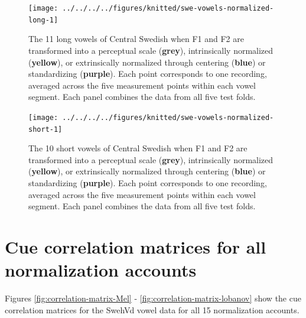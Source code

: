 \documentclass[utf8]{frontiers_suppmat} %
\begin{document}
\begin{landscape}
\begin{figure}

{\centering \texttt{[image: ../../../../figures/knitted/swe-vowels-normalized-long-1]} 

}

\caption{The 11 long vowels of Central Swedish when F1 and F2 are transformed into a perceptual scale (\textbf{grey}), intrinsically normalized (\textbf{yellow}), or extrinsically normalized through centering (\textbf{blue}) or standardizing (\textbf{purple}). Each point corresponds to one recording, averaged across the five measurement points within each vowel segment. Each panel combines the data from all five test folds.}\label{fig:swe-vowels-normalized-long}
\end{figure}

\end{landscape}

\begin{landscape}

\begin{figure}

{\centering \texttt{[image: ../../../../figures/knitted/swe-vowels-normalized-short-1]} 

}

\caption{The 10 short vowels of Central Swedish when F1 and F2 are transformed into a perceptual scale (\textbf{grey}), intrinsically normalized (\textbf{yellow}), or extrinsically normalized through centering (\textbf{blue}) or standardizing (\textbf{purple}). Each point corresponds to one recording, averaged across the five measurement points within each vowel segment. Each panel combines the data from all five test folds.}\label{fig:swe-vowels-normalized-short}
\end{figure}

\end{landscape}




\hypertarget{sec:correlation-matrices}{%
\section{Cue correlation matrices for all normalization accounts}\label{sec:correlation-matrices}}

Figures \ref{fig:correlation-matrix-Mel} - \ref{fig:correlation-matrix-lobanov} show the cue correlation matrices for the SwehVd vowel data for all 15 normalization accounts.
\end{document}
